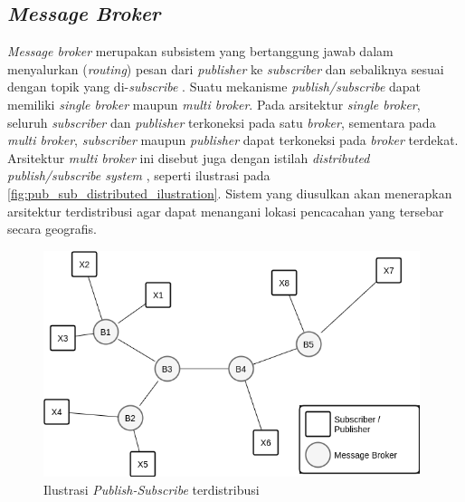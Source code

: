 \subsection{\textit{Message Broker}}
\label{ssec:message-broker}
\textit{Message broker} merupakan subsistem yang bertanggung jawab dalam menyalurkan (\textit{routing}) pesan dari \textit{publisher} ke \textit{subscriber} dan sebaliknya sesuai dengan topik yang di-\textit{subscribe} \citep{banavar_efficient_1999}. Suatu mekanisme \textit{publish/subscribe} dapat memiliki \textit{single broker} maupun \textit{multi broker}. Pada arsitektur \textit{single broker}, seluruh \textit{subscriber} dan \textit{publisher} terkoneksi pada satu \textit{broker}, sementara pada \textit{multi broker}, \textit{subscriber} maupun \textit{publisher} dapat terkoneksi pada \textit{broker} terdekat. Arsitektur \textit{multi broker} ini disebut juga dengan istilah \textit{distributed publish/subscribe system} \citep{muhl_large-scale_2002}, seperti ilustrasi pada \autoref{fig:pub_sub_distributed_ilustration}. Sistem yang diusulkan akan menerapkan arsitektur terdistribusi agar dapat menangani lokasi pencacahan yang tersebar secara geografis.


\begin{figure}[!]
	\centering
	\includegraphics[width=11cm]{Resources/Images/pub_sub_distributed_ilustration}
	\caption{Ilustrasi \textit{Publish-Subscribe} terdistribusi}
	\label{fig:pub_sub_distributed_ilustration}
\end{figure}


